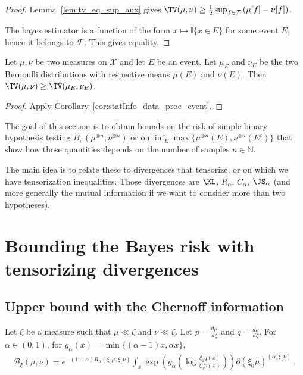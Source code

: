 \begin{proof}
Lemma~\ref{lem:tv_eq_sup_aux} gives $\TV(\mu, \nu) \ge \frac{1}{2} \sup_{f \in \mathcal F} \left( \mu[f] - \nu[f] \right)$.

The bayes estimator is a function of the form $x \mapsto \mathbb{I}\{x \in E\}$ for some event $E$, hence it belongs to $\mathcal F$. This gives equality.
\end{proof}


\begin{lemma}
  \label{lem:tv_data_proc_event}
  Let $\mu, \nu$ be two measures on $\mathcal X$ and let $E$ be an event. Let $\mu_E$ and $\nu_E$ be the two Bernoulli distributions with respective means $\mu(E)$ and $\nu(E)$.
  Then $\TV(\mu, \nu) \ge \TV(\mu_E, \nu_E)$.
\end{lemma}

\begin{proof}
Apply Corollary~\ref{cor:statInfo_data_proc_event}.
\end{proof}



The goal of this section is to obtain bounds on the risk of simple binary hypothesis testing $B_\pi(\mu^{\otimes n}, \nu^{\otimes n})$ or on $\inf_{E} \max\{\mu^{\otimes n}(E), \nu^{\otimes n}(E^c)\}$ that show how those quantities depends on the number of samples $n \in \mathbb{N}$.

The main idea is to relate these to divergences that tensorize, or on which we have tensorization inequalities. Those divergences are $\KL$, $R_\alpha$, $C_\alpha$, $\JS_\alpha$ (and more generally the mutual information if we want to consider more than two hypotheses).



\section{Bounding the Bayes risk with tensorizing divergences}

\subsection{Upper bound with the Chernoff information}

\begin{lemma}
  \label{lem:bayesBinaryRisk_eq_exp_renyi_mul_integral}
  Let $\zeta$ be a measure such that $\mu \ll \zeta$ and $\nu \ll \zeta$. Let $p = \frac{d \mu}{d\zeta}$ and $q = \frac{d \nu}{d\zeta}$.
  For $\alpha \in (0,1)$, for $g_\alpha(x) = \min\{(\alpha-1)x, \alpha x\}$,
  \begin{align*}
  \mathcal B_\xi(\mu, \nu)
  = e^{-(1 - \alpha) R_\alpha(\xi_0\mu, \xi_1\nu)} \int_x \exp \left(g_\alpha\left( \log \frac{\xi_1 q(x)}{\xi_0 p(x)} \right)\right) \partial(\xi_0\mu)^{(\alpha, \xi_1\nu)}
  \: .
  \end{align*}
\end{lemma}


